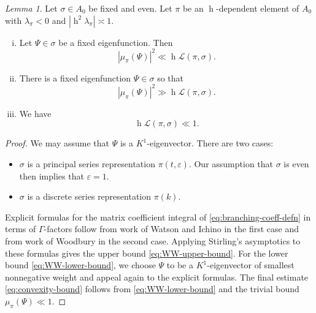 \documentclass[reqno,10pt]{amsart}
\theoremstyle{plain} %
\theoremstyle{definition}
\theoremstyle{plain} %
\theoremstyle{remark}
\theoremstyle{itplain} %
\newtheorem{lemma}{Lemma}
\theoremstyle{remark} %
\numberwithin{equation}{section}
\def\eps{\varepsilon}
\DeclareMathOperator{\h}{h}
\begin{document}
\begin{lemma}\label{lem:WW}
  Let $\sigma \in A_0$ be fixed and even.  Let $\pi$ be an $\h$-dependent element of $A_0$ with $\lambda_\pi < 0$ and $|\h^2 \lambda_\pi| \asymp 1$.
  \begin{enumerate}[(i)]
  \item Let $\Psi \in \sigma$ be a fixed eigenfunction.  Then
    \begin{equation}\label{eq:WW-upper-bound}
      |\mu_\pi(\Psi)|^2
      \ll \h \mathcal{L}(\pi,\sigma).
    \end{equation}
  \item \label{item:lower-bound-WW} There is a fixed eigenfunction $\Psi \in \sigma$ so that
    \begin{equation}\label{eq:WW-lower-bound}
      |\mu_\pi(\Psi)|^2 \gg \h \mathcal{L}(\pi,\sigma).
    \end{equation}
  \item We have
    \begin{equation}\label{eq:convexity-bound}
      \h \mathcal{L}(\pi,\sigma)
      \ll 1.
    \end{equation}
  \end{enumerate}
\end{lemma}
\begin{proof}
  We may assume that $\Psi$ is a $K^1$-eigenvector.  There are two cases:
  \begin{itemize}
  \item $\sigma$ is a principal series representation $\pi(t,\eps)$.  Our assumption that $\sigma$ is even then implies that $\eps = 1$.
  \item $\sigma$ is a discrete series representation $\pi(k)$.
  \end{itemize}
  Explicit formulas for the matrix coefficient integral of \eqref{eq:branching-coeff-defn} in terms of $\Gamma$-factors follow from work of Watson \cite{watson-2008} and Ichino \cite{MR2449948} in the first case and from work of Woodbury \cite[Appendix]{2013arXiv1303.6972S} in the second case.  Applying Stirling's asymptotics to these formulas gives the upper bound \eqref{eq:WW-upper-bound}.  For the lower bound \eqref{eq:WW-lower-bound}, we choose $\Psi$ to be a $K^1$-eigenvector of smallest nonnegative weight and appeal again to the explicit formulas.  The final estimate \eqref{eq:convexity-bound} follows from \eqref{eq:WW-lower-bound} and the trivial bound $\mu_\pi(\Psi) \ll 1$.
\end{proof}
\end{document}

